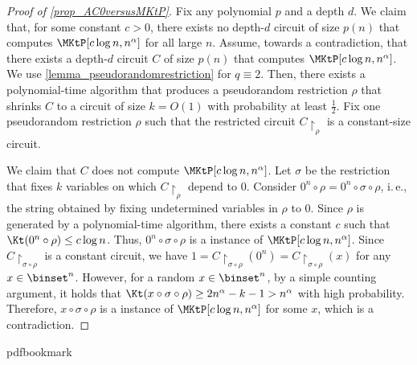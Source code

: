 \documentclass[11pt]{article}
\numberwithin{equation}{section}
\theoremstyle{definition}
\theoremstyle{plain}
\newcommand{\ie}{i.\,e.}
\begin{document}
\begin{proof}
  [Proof of \cref{prop_AC0versusMKtP}]
  Fix any polynomial $p$ and a depth $d$.
  We claim that,
  for some constant $c > 0$,
  there exists no depth-$d$ circuit of size $p(n)$ that computes $\MKtP[c \log n, n^{\alpha}]$ for all large $n$.
  Assume, towards a contradiction, that there exists a depth-$d$ circuit $C$ of size $p(n)$ that computes $\MKtP[c \log n, n^{\alpha}]$.
  We use \cref{lemma_pseudorandomrestriction} for $q \equiv 2$.
  Then, there exists a polynomial-time algorithm that produces a pseudorandom restriction $\rho$ that shrinks $C$ to a circuit of size $k = O(1)$
  with probability at least $\frac{1}{2}$.
  Fix one pseudorandom restriction $\rho$ such that the restricted circuit $C\restriction_\rho$ is a constant-size circuit.

  We claim that $C$ does not compute $\MKtP[c \log n, n^{\alpha}]$.
  Let $\sigma$ be the restriction that fixes $k$ variables on which $C\restriction_\rho$ depend to $0$.
  Consider $0^n \circ \rho = 0^n \circ \sigma \circ \rho$, \ie, the string obtained by fixing undetermined variables in $\rho$ to $0$.
  Since $\rho$ is generated by a polynomial-time algorithm,
  there exists a constant $c$ such that $\Kt(0^n \circ \rho) \le c \log n$.
  Thus, $0^n \circ \sigma \circ \rho$ is a \Yes instance of $\MKtP[c \log n, n^{\alpha}]$.
  Since $C\restriction_{\sigma \circ \rho}$ is a constant circuit, we have $1 = C\restriction_{\sigma \circ \rho}(0^n) = C\restriction_{\sigma \circ \rho}(x)$
  for any $x \in \binset^n$.
  However, for a random $x \in \binset^n$,
  by a simple counting argument, it holds that $\Kt(x \circ \sigma \circ \rho) \ge 2 n^\alpha - k - 1 > n^\alpha$ with high probability.
  Therefore, $x \circ \sigma \circ \rho$ is a \No instance of $\MKtP[c \log n, n^{\alpha}]$ for some $x$, which is a contradiction.
\end{proof}




\newcommand{\prelim}{Preliminary version in\ }\newcommand{\prelims}{Preliminary
  versions in\ }
\providecommand{\bibhead}[1]{}
\expandafter\ifx\csname pdfbookmark\endcsname\relax%
  \providecommand{\tocrefpdfbookmark}{}
\else\providecommand{\tocrefpdfbookmark}{%
   \hypertarget{tocreferences}{}%
   \pdfbookmark[1]{References}{tocreferences}}%
\fi
\end{document}
